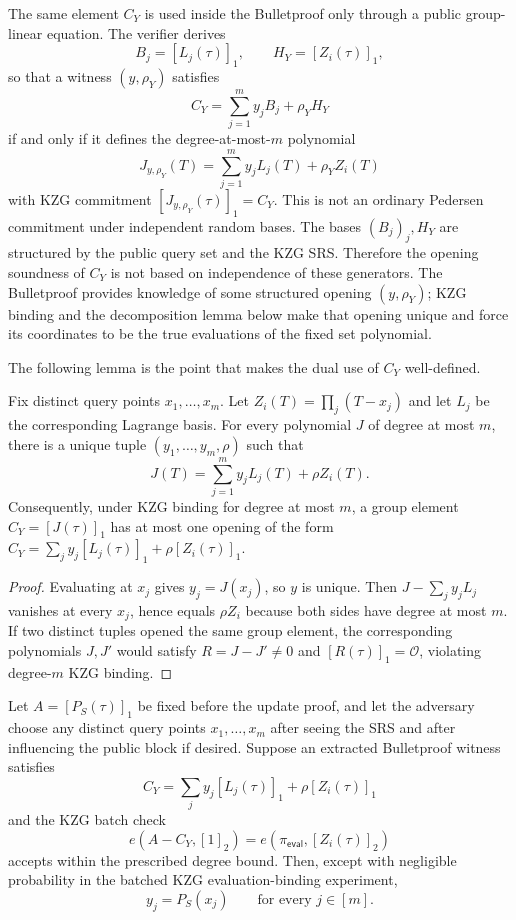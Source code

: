 \documentclass[runningheads]{llncs}
\begin{document}
The same element \(C_Y\) is used inside the Bulletproof only through a public group-linear equation.  The verifier derives
\[
        B_j=[L_j(\tau)]_1,
        \qquad
        H_Y=[Z_i(\tau)]_1,
\]
so that a witness \((y,\rho_Y)\) satisfies
\[
        C_Y=\sum_{j=1}^m y_jB_j+\rho_YH_Y
\]
if and only if it defines the degree-at-most-\(m\) polynomial
\[
        J_{y,\rho_Y}(T)=\sum_{j=1}^m y_jL_j(T)+\rho_YZ_i(T)
\]
with KZG commitment \([J_{y,\rho_Y}(\tau)]_1=C_Y\).  This is not an ordinary Pedersen commitment under independent random bases.  The bases \((B_j)_j,H_Y\) are structured by the public query set and the KZG SRS.  Therefore the opening soundness of \(C_Y\) is not based on independence of these generators.  The Bulletproof provides knowledge of some structured opening \((y,\rho_Y)\); KZG binding and the decomposition lemma below make that opening unique and force its coordinates to be the true evaluations of the fixed set polynomial.

The following lemma is the point that makes the dual use of \(C_Y\) well-defined.

\begin{lemma}\label{lem:structured-cy}
Fix distinct query points \(x_1,\ldots,x_m\).  Let \(Z_i(T)=\prod_j(T-x_j)\) and let \(L_j\) be the corresponding Lagrange basis.  For every polynomial \(J\) of degree at most \(m\), there is a unique tuple \((y_1,\ldots,y_m,\rho)\) such that
\[
        J(T)=\sum_{j=1}^m y_jL_j(T)+\rho Z_i(T).
\]
Consequently, under KZG binding for degree at most \(m\), a group element \(C_Y=[J(\tau)]_1\) has at most one opening of the form \(C_Y=\sum_j y_j[L_j(\tau)]_1+\rho[Z_i(\tau)]_1\).
\end{lemma}

\begin{proof}
Evaluating at \(x_j\) gives \(y_j=J(x_j)\), so \(y\) is unique.  Then \(J-\sum_jy_jL_j\) vanishes at every \(x_j\), hence equals \(\rho Z_i\) because both sides have degree at most \(m\).  If two distinct tuples opened the same group element, the corresponding polynomials \(J,J'\) would satisfy \(R=J-J'\ne0\) and \([R(\tau)]_1=\mathcal O\), violating degree-\(m\) KZG binding.
\end{proof}

\begin{lemma}\label{lem:adv-query-cy}
Let \(A=[P_S(\tau)]_1\) be fixed before the update proof, and let the adversary choose any distinct query points \(x_1,\ldots,x_m\) after seeing the SRS and after influencing the public block if desired.  Suppose an extracted Bulletproof witness satisfies
\[
        C_Y=\sum_j y_j[L_j(\tau)]_1+\rho[Z_i(\tau)]_1
\]
and the KZG batch check
\[
        e(A-C_Y,[1]_2)=e(\pi_{\mathsf{eval}},[Z_i(\tau)]_2)
\]
accepts within the prescribed degree bound.  Then, except with negligible probability in the batched KZG evaluation-binding experiment,
\[
        y_j=P_S(x_j)\qquad\text{for every }j\in[m].
\]
\end{lemma}
\end{document}
